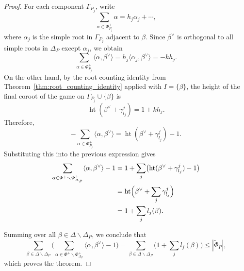 \documentclass[10pt,a4paper]{amsart}
\begin{document}
\begin{proof}
For each component $\Gamma_{P_j}$, write
\[
\sum_{\alpha\in \Phi_{P_j}^+}\alpha
=
h_j\alpha_j+\cdots,
\]
where $\alpha_j$ is the simple root in $\Gamma_{P_j}$ adjacent to $\beta$.
Since $\beta^\vee$ is orthogonal to all simple roots in $\Delta_P$ except $\alpha_j$, we obtain
\[
\sum_{\alpha\in \Phi_{P_j}^+}\langle \alpha,\beta^\vee\rangle
=
h_j\langle \alpha_j,\beta^\vee\rangle
=
-kh_j.
\]
On the other hand, by the root counting identity from Theorem~\ref{thm:root_counting_identity} applied with $I=\{\beta\}$, the height of the final coroot of the game on $\Gamma_{P_j}\cup\{\beta\}$ is
\[
\operatorname{ht}(\beta^\vee+\gamma_{l_j}^j)=1+kh_j.
\]
Therefore,
\[
-\sum_{\alpha\in \Phi_{P_j}^+}\langle \alpha,\beta^\vee\rangle
=
\operatorname{ht}(\beta^\vee+\gamma_{l_j}^j)-1.
\]
Substituting this into the previous expression gives
\begin{align*}
\sum_{\alpha\in \Phi^+\smallsetminus \Phi_{\Delta_P}^+}
\langle \alpha,\beta^\vee\rangle-1
&=
1+\sum_j
\bigl(\operatorname{ht}(\beta^\vee+\gamma_{l_j}^j)-1\bigr) \\
&=
\operatorname{ht}\Bigl(\beta^\vee+\sum_j\gamma_{l_j}^j\Bigr) \\
&=
1+\sum_j l_j(\beta).
\end{align*}

Summing over all $\beta\in \Delta \smallsetminus \Delta_P$, we conclude that
\[
\sum_{\beta\in \Delta \smallsetminus \Delta_P}
\Biggl(
\sum_{\alpha\in \Phi^+\smallsetminus \Phi_{\Delta_P}^+}
\langle \alpha,\beta^\vee\rangle-1
\Biggr)
=
\sum_{\beta\in \Delta \smallsetminus \Delta_P}
\bigl(1+\sum_j l_j(\beta)\bigr)
\le |\tilde{\Phi}_{P}|,
\]
which proves the theorem.
\end{proof}
\end{document}
